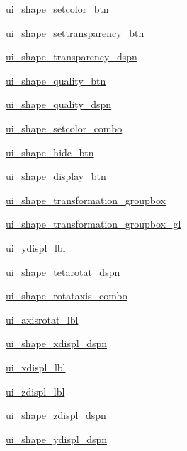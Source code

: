 \begin{DoxyCompactItemize}
\item 
\hyperlink{a00098_a2b9029cd44541c9b09508f9cddbbffd7}{ui\+\_\+shape\+\_\+setcolor\+\_\+btn}
\item 
\hyperlink{a00098_a29e4e3e1bc1a96b5b5970f03ccdc3258}{ui\+\_\+shape\+\_\+settransparency\+\_\+btn}
\item 
\hyperlink{a00098_a0ad9bf35073cf45204d5ddca0156df53}{ui\+\_\+shape\+\_\+transparency\+\_\+dspn}
\item 
\hyperlink{a00098_a4ee4bf54cb958bebdc43e8598dcdd459}{ui\+\_\+shape\+\_\+quality\+\_\+btn}
\item 
\hyperlink{a00098_a091706f3093b19dadcf896b4fc354dc1}{ui\+\_\+shape\+\_\+quality\+\_\+dspn}
\item 
\hyperlink{a00098_a6412380402adf28d010e459b538c97be}{ui\+\_\+shape\+\_\+setcolor\+\_\+combo}
\item 
\hyperlink{a00098_af27038ec976b97c8007f5914afb2f4ed}{ui\+\_\+shape\+\_\+hide\+\_\+btn}
\item 
\hyperlink{a00098_ae8028f5880df8b13414eba6f474a3aee}{ui\+\_\+shape\+\_\+display\+\_\+btn}
\item 
\hyperlink{a00098_a1fc23acd26cd3067a21b1814e61be00e}{ui\+\_\+shape\+\_\+transformation\+\_\+groupbox}
\item 
\hyperlink{a00098_aebd41dcf93d9fad7a4dca658b1889a44}{ui\+\_\+shape\+\_\+transformation\+\_\+groupbox\+\_\+gl}
\item 
\hyperlink{a00098_a692312c2b09073353e2bfb7432092583}{ui\+\_\+ydispl\+\_\+lbl}
\item 
\hyperlink{a00098_aa28c70006d121bac80ae12022d751fd9}{ui\+\_\+shape\+\_\+tetarotat\+\_\+dspn}
\item 
\hyperlink{a00098_ab8782732fd9dcbabe62718d4fd1eb451}{ui\+\_\+shape\+\_\+rotataxis\+\_\+combo}
\item 
\hyperlink{a00098_a9f2714b1287e94beaec813c4859a76ed}{ui\+\_\+axisrotat\+\_\+lbl}
\item 
\hyperlink{a00098_a9a614d93a0e921aa5e8e2692269ea93e}{ui\+\_\+shape\+\_\+xdispl\+\_\+dspn}
\item 
\hyperlink{a00098_a365b7f614170273dffc60d90f68e7b50}{ui\+\_\+xdispl\+\_\+lbl}
\item 
\hyperlink{a00098_a6393abac6ef3d14dd99f90c2038ce668}{ui\+\_\+zdispl\+\_\+lbl}
\item 
\hyperlink{a00098_ac2513163c4489ee11aa128f248ac25bc}{ui\+\_\+shape\+\_\+zdispl\+\_\+dspn}
\item 
\hyperlink{a00098_a6d782a6f55b193b51dbc457441b6bb6b}{ui\+\_\+shape\+\_\+ydispl\+\_\+dspn}

\end{DoxyCompactItemize}
